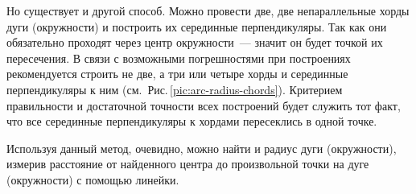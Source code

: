 Но существует и другой способ. Можно провести две, две непараллельные хорды дуги (окружности) и построить их серединные перпендикуляры. Так как они обязательно проходят через центр окружности~--- значит он будет точкой их пересечения. В связи с возможными погрешностями при построениях рекомендуется строить не две, а три или четыре хорды и серединные перпендикуляры к ним (см.~Рис.\,\ref{pic:arc-radius-chords}). Критерием правильности и достаточной точности всех построений будет служить тот факт, что все серединные перпендикуляры к хордами пересеклись в одной точке.

Используя данный метод, очевидно, можно найти и радиус дуги (окружности), измерив расстояние от найденного  центра до произвольной точки на дуге (окружности) с помощью линейки.

